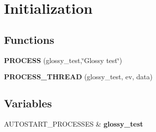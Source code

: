 \hypertarget{group__glossy-test-init}{
\section{Initialization}
\label{group__glossy-test-init}
}
\subsection*{Functions}
\begin{DoxyCompactItemize}
\item 
\hypertarget{group__glossy-test-init_gaedc8ea09700fab6ffa609345ef21407d}{
{\bfseries PROCESS} (glossy\_\-test,\char`\"{}Glossy test\char`\"{})}
\label{group__glossy-test-init_gaedc8ea09700fab6ffa609345ef21407d}

\item 
\hypertarget{group__glossy-test-init_ga017ea7392ceaa675dbf770b2fbe13097}{
{\bfseries PROCESS\_\-THREAD} (glossy\_\-test, ev, data)}
\label{group__glossy-test-init_ga017ea7392ceaa675dbf770b2fbe13097}

\end{DoxyCompactItemize}
\subsection*{Variables}
\begin{DoxyCompactItemize}
\item 
\hypertarget{group__glossy-test-init_ga32cc397a384ec81c0310150a939756f7}{
AUTOSTART\_\-PROCESSES \& {\bfseries glossy\_\-test}}
\label{group__glossy-test-init_ga32cc397a384ec81c0310150a939756f7}

\end{DoxyCompactItemize}
